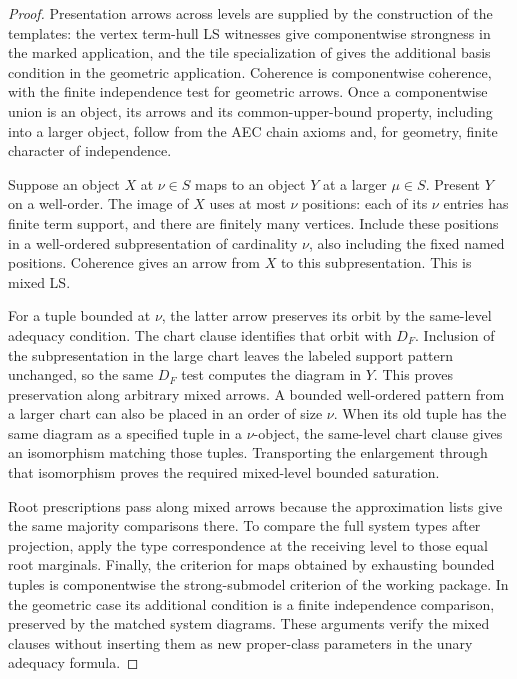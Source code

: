 \begin{proof}
Presentation arrows across levels are supplied by the construction of
the templates: the vertex term-hull LS witnesses give componentwise
strongness in the marked application, and the tile specialization of
 gives the additional basis condition in the
geometric application.  Coherence is componentwise coherence, with the
finite independence test for geometric arrows.  Once a componentwise
union is an object, its arrows and its common-upper-bound property,
including into a larger object, follow from the AEC chain axioms and,
for geometry, finite character of independence.

Suppose an object $X$ at $\nu\in S$ maps to an object $Y$ at a larger
$\mu\in S$.  Present $Y$ on a well-order.  The image of $X$ uses at most
$\nu$ positions: each of its $\nu$ entries has finite term support, and
there are finitely many vertices.  Include these positions in a
well-ordered subpresentation of cardinality $\nu$, also including the
fixed named positions.  Coherence gives an arrow from $X$ to this
subpresentation.  This is mixed LS.

For a tuple bounded at $\nu$, the latter arrow preserves its orbit by
the same-level adequacy condition.  The chart clause identifies that
orbit with $D_F$.  Inclusion of the subpresentation in the large chart
leaves the labeled support pattern unchanged, so the same $D_F$ test
computes the diagram in $Y$.  This proves preservation along arbitrary
mixed arrows.  A bounded well-ordered pattern from a larger chart can
also be placed in an order of size $\nu$.  When its old tuple has the
same diagram as a specified tuple in a $\nu$-object, the same-level
chart clause gives an isomorphism matching those tuples.  Transporting
the enlargement through that isomorphism proves the required
mixed-level bounded saturation.

Root prescriptions pass along mixed arrows because the approximation
lists give the same majority comparisons there.  To compare the full
system types after projection, apply the type correspondence at the
receiving level to those equal root marginals.  Finally, the criterion
for maps obtained by exhausting bounded tuples is componentwise the
strong-submodel criterion of the working package.  In the geometric
case its additional condition is a finite independence comparison,
preserved by the matched system diagrams.  These arguments verify the
mixed clauses without inserting them as new proper-class parameters in
the unary adequacy formula.
\end{proof}

